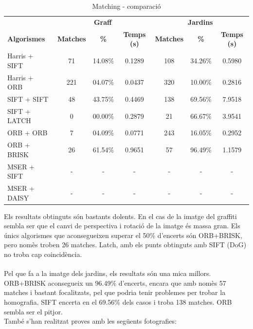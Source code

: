 		\begin{table}[H]
			\begin{center}
				\begin{tabular}{l | c c c | c c c}
					& \multicolumn{3}{c|}{\textbf{Graff}} & \multicolumn{3}{c}{\textbf{Jardins}} \\
					\textbf{Algorismes} & \textbf{Matches} & \textbf{\%} & \textbf{Temps (s)} & \textbf{Matches} & \textbf{\%} & \textbf{Temps (s)} \\ \hline
					Harris + SIFT & 71 & 14.08\% & 0.1289 & 108 & 34.26\% & 0.5980 \\
					Harris + ORB & 221 & 04.07\% & 0.0437 & 320 & 10.00\% & 0.2816 \\
					SIFT + SIFT & 48 & 43.75\% & 0.4469 & 138 & 69.56\% & 7.9518 \\
					SIFT + LATCH & 0 & 00.00\% & 0.2879 & 21 & 66.67\% & 3.9541 \\
					ORB + ORB & 7 & 04.09\% & 0.0771 & 243 & 16.05\% & 0.2952 \\
					ORB + BRISK & 26 & 61.54\% & 0.9651 & 57 & 96.49\% & 1.1579 \\
					MSER + SIFT & - & - & - & - & - & - \\
					MSER + DAISY & - & - & - & - & - & - \\
				\end{tabular}
			\end{center}
			\caption{Matching - comparació}
		\end{table}
		\noindent
		Els resultats obtinguts són bastants dolents. En el cas de la imatge del graffiti sembla ser que el canvi de perspectiva i rotació de la imatge és massa gran.
		Els únics algorismes que aconsegueixen superar el 50\% d'encerts són ORB+BRISK, pero nomès troben 26 matches. Latch, amb els punts obtinguts amb SIFT (DoG) no troba cap coincidència.\\\\
		Pel que fa a la imatge dels jardins, els resultats són una mica millors. ORB+BRISK aconsegueix un 96.49\% d'encerts, encara que amb nomès 57 matches i bastant focalitzats, pel que podria tenir
		problemes per trobar la homografia. SIFT encerta en el 69.56\% dels casos i troba 138 matches. ORB sembla ser el pitjor.\\

		\noindent
		També s'han realitzat proves amb les següents fotografies:


